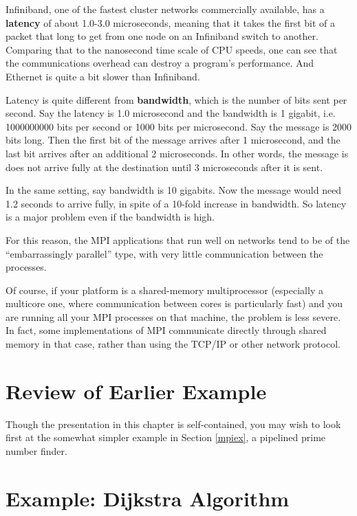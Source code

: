 Infiniband, one of the fastest cluster networks commercially available,
has a {\bf latency} of about 1.0-3.0 microseconds, meaning that it takes
the first bit of a packet that long to get from one node on an
Infiniband switch to another.  Comparing that to the nanosecond time
scale of CPU speeds, one can see that the communications overhead can
destroy a program's performance.  And Ethernet is quite a bit slower
than Infiniband.

Latency is quite different from {\bf bandwidth}, which is the number of
bits sent per second.  Say the latency is 1.0 microsecond and the
bandwidth is 1 gigabit, i.e. 1000000000 bits per second or 1000 bits
per microsecond.  Say the message is 2000 bits long.  Then the first bit 
of the message arrives after 1 microsecond, and the last bit arrives
after an additional 2 microseconds.  In other words, the message is does
not arrive fully at the destination until 3 microseconds after it is
sent.

In the same setting, say bandwidth is 10 gigabits.  Now the message
would need 1.2 seconds to arrive fully, in spite of a 10-fold increase
in bandwidth.  So latency is a major problem even if the bandwidth is
high.  

For this reason, the MPI applications that run well on networks tend to
be of the ``embarrassingly parallel'' type, with very little
communication between the processes.

Of course, if your platform is a shared-memory multiprocessor
(especially a multicore one, where communication between cores is
particularly fast) and you are running all your MPI processes on that
machine, the problem is less severe.  In fact, some implementations of
MPI communicate directly through shared memory in that case, rather than
using the TCP/IP or other network protocol.

\section{Review of Earlier Example}

Though the presentation in this chapter is self-contained, you may wish
to look first at the somewhat simpler example in Section \ref{mpiex}, a
pipelined prime number finder.

\section{Example:  Dijkstra Algorithm}

